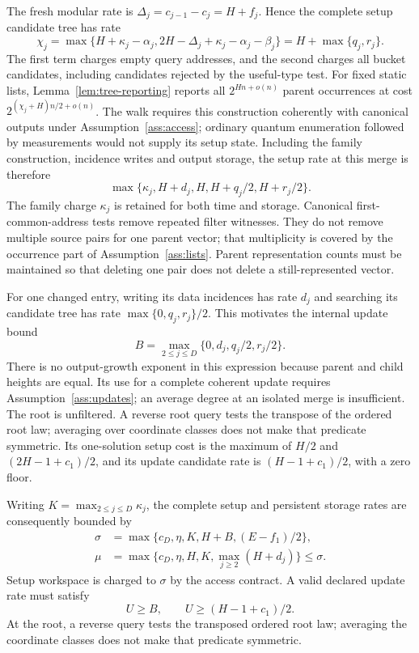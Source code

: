 \documentclass[10pt,a4paper]{article}
\theoremstyle{definition}
\begin{document}
The fresh modular rate is
$\Delta_j=c_{j-1}-c_j=H+f_j$. Hence the complete setup candidate tree has
rate
\[
 \chi_j=\max\{H+\kappa_j-\alpha_j,
       2H-\Delta_j+\kappa_j-\alpha_j-\beta_j\}
       =H+\max\{q_j,r_j\}.
\]
The first term charges empty query addresses, and the second charges
all bucket candidates, including candidates rejected by the useful-type
test. For fixed static lists, Lemma~\ref{lem:tree-reporting} reports all $2^{Hn+o(n)}$ parent occurrences at cost
$2^{(\chi_j+H)n/2+o(n)}$. The walk requires this construction coherently
with canonical outputs under Assumption~\ref{ass:access}; ordinary
quantum enumeration followed by measurements would not supply its setup
state. Including the family construction,
incidence writes and output storage, the setup rate at this merge is
therefore
\begin{equation}
 \max\{\kappa_j,H+d_j,H,H+q_j/2,H+r_j/2\}.
 \label{qraqm:merge-setup}
\end{equation}
The family charge $\kappa_j$ is retained for both time and storage.
Canonical first-common-address tests remove repeated filter witnesses.
They do not remove multiple source pairs for one parent vector; that
multiplicity is covered by the occurrence part of
Assumption~\ref{ass:lists}. Parent representation counts must be maintained
so that deleting one pair does not delete a still-represented vector.

For one changed entry, writing its data incidences has rate $d_j$ and
searching its candidate tree has rate $\max\{0,q_j,r_j\}/2$. This motivates
the internal update bound
\[
 B=\max_{2\le j\le D}\{0,d_j,q_j/2,r_j/2\}.
\]
There is no output-growth exponent in this expression because parent
and child heights are equal. Its use for a complete coherent update
requires Assumption~\ref{ass:updates}; an average degree at an isolated
merge is insufficient. The root is unfiltered. A reverse root query tests the transpose of the
ordered root law; averaging over coordinate classes does not make that
predicate symmetric. Its one-solution setup cost is the maximum of $H/2$ and $(2H-1+c_1)/2$, and its update
candidate rate is $(H-1+c_1)/2$, with a zero floor.

Writing $K=\max_{2\le j\le D}\kappa_j$, the complete setup and persistent
storage rates are consequently bounded by
\begin{align}
 \sigma&=\max\{c_D,\eta,K,H+B,(E-f_1)/2\},
       \label{qraqm:setup}\\
 \mu&=\max\{c_D,\eta,H,K,\max_{j\ge2}(H+d_j)\}\le\sigma.
       \label{qraqm:storage}
\end{align}
Setup workspace is charged to $\sigma$ by the access contract. A valid
declared update rate must satisfy
\begin{equation}
 U\ge B,\qquad U\ge(H-1+c_1)/2.
 \label{qraqm:update}
\end{equation}
At the root, a reverse query tests the transposed ordered root law;
averaging the coordinate classes does not make that predicate symmetric.
\end{document}
